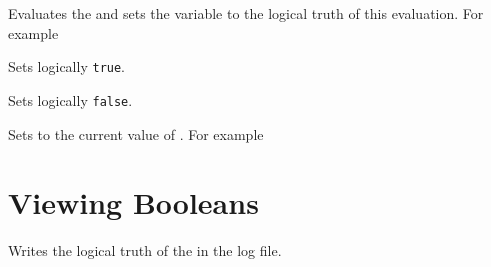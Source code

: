 \documentclass[oneside]{book}
\begin{document}
\begin{function}{\boolSet}
\begin{syntax}
  
\end{syntax}
Evaluates the  and sets the  variable to
the logical truth of this evaluation.
For example
\begin{codehigh}
\boolSet {}
\boolVarLog \lTmpaBool
\end{codehigh}
\begin{codehigh}
\boolSet {}
\boolVarLog \lTmpaBool
\end{codehigh}
\end{function}

\begin{function}{\boolSetTrue}
\begin{syntax}
 
\end{syntax}
Sets  logically \texttt{true}.
\end{function}

\begin{function}{\boolSetFalse}
\begin{syntax}
 
\end{syntax}
Sets  logically \texttt{false}.
\end{function}

\begin{function}{\boolSetEq}
\begin{syntax}
  
\end{syntax}
Sets  to the current value of .
For example
\begin{codehigh}
\boolSetTrue \lTmpaBool
\boolSetEq \lTmpbBool \lTmpaBool
\boolVarLog \lTmpbBool
\end{codehigh}
\end{function}

\section{Viewing Booleans}

\begin{function}{\boolLog}
\begin{syntax}
 
\end{syntax}
Writes the logical truth of the  in the log file.
\end{function}
\end{document}
